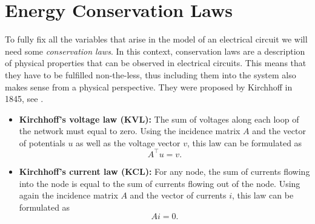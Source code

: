 \section{Energy Conservation Laws}
To fully fix all the variables that arise in the model of an electrical circuit we will need some \emph{conservation laws}. In this context, conservation laws are a description of physical properties that can be observed in electrical circuits. This means that they have to be fulfilled non-the-less, thus including them into the system also makes sense from a physical perspective. They were proposed by Kirchhoff in 1845, see \cite{KirchhoffsLaws}.
\begin{itemize}
	\item \textbf{Kirchhoff's voltage law (KVL):} \newline
	The sum of voltages along each loop of the network must equal to zero. Using the incidence matrix $A$ and the vector of potentials $u$ as well as the voltage vector $v$, this law can be formulated as
	\begin{equation}
		\label{KVL}
		A^\top  u = v.
	\end{equation}
	\item \textbf{Kirchhoff's current law (KCL):} \newline
	For any node, the sum of currents flowing into the node is equal to the sum of currents flowing out of the node. Using again the incidence matrix $A$ and the vector of currents $i$, this law can be formulated as
	\begin{equation}
		\label{KCL}
		A  i = 0.
	\end{equation}
\end{itemize}

